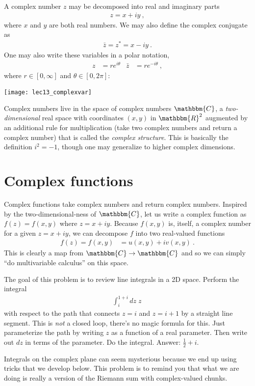 A complex number $z$ may be decomposed into real and imaginary parts
\begin{align}
  z = x + i y \ ,
\end{align}
where $x$ and $y$ are both real numbers. We may also define the complex conjugate as
\begin{align}
  \bar z = z^* = x - i y \ .
\end{align}
One may also write these variables in a polar notation,
\begin{align}
  z &= re^{i\theta}
  &
  \bar z &= re^{-i\theta} \ ,
\end{align}
where $r \in [0,\infty]$ and $\theta \in [0, 2\pi]$:
\begin{center}
\texttt{[image: lec13\_complexvar]}
\end{center}
Complex numbers live in the space of complex numbers $\mathbbm{C}$, a \emph{two-dimensional} real space with coordinates $(x,y)$ in $\mathbbm{R}^2$ augmented by an additional rule for multiplication (take two complex numbers and return a complex number) that is called the \emph{complex structure}. This is basically the definition $i^2 = -1$, though one may generalize to higher complex dimensions. 

\section{Complex functions}

Complex functions take complex numbers and return complex numbers. Inspired by the two-dimensional-ness of $\mathbbm{C}$, let us write a complex function as $f(z)=f(x,y)$ where $z = x+i y$. Because $f(x,y)$ is, itself, a complex number for a given $z=x+i y$, we can decompose $f$ into two real-valued functions
\begin{align}
  f(z) = f(x,y) &= u(x,y) + i v(x,y) \ .
\end{align}
This is clearly a map from $\mathbbm{C} \to \mathbbm{C}$ and so we can simply ``do multivariable calculus'' on this space. 

\begin{exercise}
The goal of this problem is to review line integrals in a 2D space. Perform the integral
\begin{align}
  \int_i^{1+i} dz \; z \,
\end{align}
with respect to the path that connects $z=i$ and $z=i+1$ by a straight line segment. This is \emph{not} a closed loop, there's no magic formula for this. Just parameterize the path by writing $z$ as a function of a real parameter. Then write out $dz$ in terms of the parameter. Do the integral. Answer: $\frac{1}{2}+i$.

 Integrals on the complex plane can seem mysterious because we end up using tricks that we develop below. This problem is to remind you that what we are doing is really a version of the Riemann sum with complex-valued chunks. 
\end{exercise}


